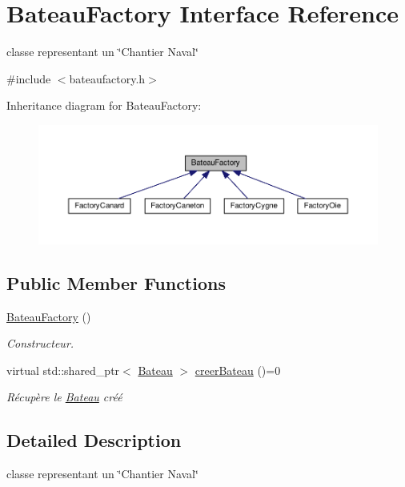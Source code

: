 \hypertarget{classBateauFactory}{\section{Bateau\+Factory Interface Reference}
\label{classBateauFactory}
}


classe representant un \char`\"{}\+Chantier Naval\char`\"{}  




{\ttfamily \#include $<$bateaufactory.\+h$>$}



Inheritance diagram for Bateau\+Factory\+:
\nopagebreak
\begin{figure}[H]
\begin{center}
\leavevmode
\includegraphics[width=350pt]{classBateauFactory__inherit__graph}
\end{center}
\end{figure}
\subsection*{Public Member Functions}
\begin{DoxyCompactItemize}
\item 
\hyperlink{classBateauFactory_ab2c99aa64b7804fa2d67699a2d80703a}{Bateau\+Factory} ()
\begin{DoxyCompactList}\small\item\em Constructeur. \end{DoxyCompactList}\item 
virtual std\+::shared\+\_\+ptr$<$ \hyperlink{classBateau}{Bateau} $>$ \hyperlink{classBateauFactory_a8cec9c2ab3793cec80e43b3d940da1d9}{creer\+Bateau} ()=0
\begin{DoxyCompactList}\small\item\em Récupère le \hyperlink{classBateau}{Bateau} créé \end{DoxyCompactList}\end{DoxyCompactItemize}


\subsection{Detailed Description}
classe representant un \char`\"{}\+Chantier Naval\char`\"{} 

